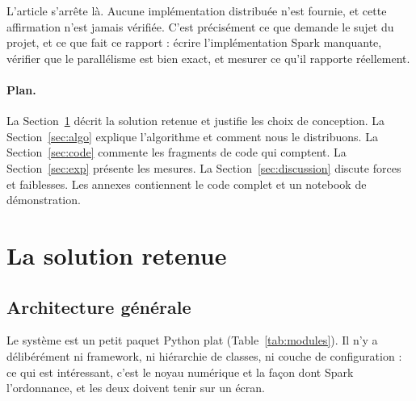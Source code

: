 \documentclass[11pt,a4paper]{article}
\begin{document}
L'article s'arrête là. Aucune implémentation distribuée n'est fournie, et cette
affirmation n'est jamais vérifiée. C'est précisément ce que demande le sujet du projet,
et ce que fait ce rapport : écrire l'implémentation Spark manquante, vérifier que le
parallélisme est bien exact, et mesurer ce qu'il rapporte réellement.

\paragraph{Plan.} La Section~\ref{sec:solution} décrit la solution retenue et justifie
les choix de conception. La Section~\ref{sec:algo} explique l'algorithme et comment
nous le distribuons. La Section~\ref{sec:code} commente les fragments de code qui
comptent. La Section~\ref{sec:exp} présente les mesures. La
Section~\ref{sec:discussion} discute forces et faiblesses. Les annexes contiennent le
code complet et un notebook de démonstration.

\section{La solution retenue}\label{sec:solution}

\subsection{Architecture générale}

Le système est un petit paquet Python plat (Table~\ref{tab:modules}). Il n'y a
délibérément ni framework, ni hiérarchie de classes, ni couche de configuration : ce
qui est intéressant, c'est le noyau numérique et la façon dont Spark l'ordonnance, et
les deux doivent tenir sur un écran.
\end{document}
